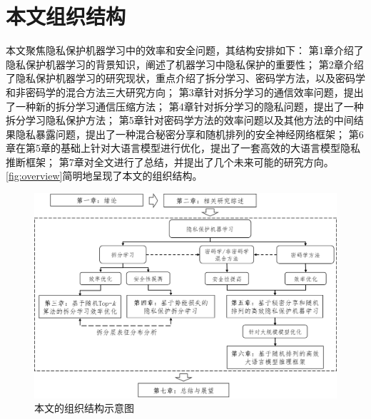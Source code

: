 \section{本文组织结构}
本文聚焦隐私保护机器学习中的效率和安全问题，其结构安排如下：
%
第1章介绍了隐私保护机器学习的背景知识，阐述了机器学习中隐私保护的重要性；
第2章介绍了隐私保护机器学习的研究现状，重点介绍了拆分学习、密码学方法，以及密码学和非密码学的混合方法三大研究方向；
第3章针对拆分学习的通信效率问题，提出了一种新的拆分学习通信压缩方法；
第4章针对拆分学习的隐私问题，提出了一种拆分学习隐私保护方法；
第5章针对密码学方法的效率问题以及其他方法的中间结果隐私暴露问题，提出了一种混合秘密分享和随机排列的安全神经网络框架；
第6章在第5章的基础上针对大语言模型进行优化，提出了一套高效的大语言模型隐私推断框架；
第7章对全文进行了总结，并提出了几个未来可能的研究方向。
%
\autoref{fig:overview}简明地呈现了本文的组织结构。

\begin{figure}[h!]
    \centering
    \includegraphics[width=\linewidth]{Z_Resources/article_overview.png}
    \caption{本文的组织结构示意图}
    \label{fig:overview}
\end{figure}